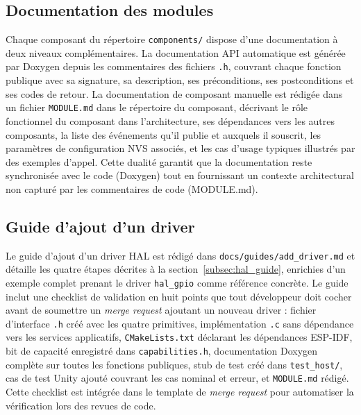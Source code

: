 \subsection{Documentation des modules}
\label{subsec:doc_mods}

Chaque composant du répertoire \texttt{components/} dispose d'une
documentation à deux niveaux complémentaires. La documentation API
automatique est générée par Doxygen depuis les commentaires des fichiers
\texttt{.h}, couvrant chaque fonction publique avec sa signature,
sa description, ses préconditions, ses postconditions et ses codes
de retour. La documentation de composant manuelle est rédigée dans
un fichier \texttt{MODULE.md} dans le répertoire du composant,
décrivant le rôle fonctionnel du composant dans l'architecture, ses
dépendances vers les autres composants, la liste des événements
qu'il publie et auxquels il souscrit, les paramètres de configuration
NVS associés, et les cas d'usage typiques illustrés par des exemples
d'appel. Cette dualité garantit que la documentation reste synchronisée
avec le code (Doxygen) tout en fournissant un contexte architectural
non capturé par les commentaires de code (MODULE.md).

\subsection{Guide d'ajout d'un driver}
\label{subsec:doc_driver}

Le guide d'ajout d'un driver HAL est rédigé dans
\texttt{docs/guides/add\_driver.md} et détaille les quatre étapes
décrites à la section~\ref{subsec:hal_guide}, enrichies d'un exemple
complet prenant le driver \texttt{hal\_gpio} comme référence concrète.
Le guide inclut une checklist de validation en huit points que tout
développeur doit cocher avant de soumettre un \textit{merge request}
ajoutant un nouveau driver : fichier d'interface \texttt{.h} créé avec
les quatre primitives, implémentation \texttt{.c} sans dépendance vers
les services applicatifs, \texttt{CMakeLists.txt} déclarant les
dépendances ESP-IDF, bit de capacité enregistré dans \texttt{capabilities.h},
documentation Doxygen complète sur toutes les fonctions publiques,
stub de test créé dans \texttt{test\_host/}, cas de test Unity ajouté
couvrant les cas nominal et erreur, et \texttt{MODULE.md} rédigé. Cette
checklist est intégrée dans le template de \textit{merge request}
pour automatiser la vérification lors des revues de code.


